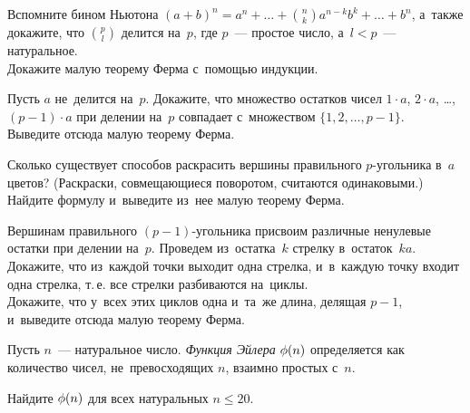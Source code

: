 \begin{problems}

\item
\subproblem
Вспомните бином Ньютона
\(
    (a + b)^{n}
=
    a^{n} + \ldots + \binom{n}{k} a^{n-k} b^{k} + \ldots + b^{n}
\),
а~также докажите, что $\binom{p}{l}$ делится на~$p$, где $p$~--- простое число,
а~$l < p$~--- натуральное.
\\
\subproblem
Докажите малую теорему Ферма с~помощью индукции.

\item%
%
\subproblem
Пусть $a$ не~делится на~$p$.
Докажите, что множество остатков чисел
$1 \cdot a$, $2\cdot a$, \ldots, $(p - 1) \cdot a$ при делении на~$p$ совпадает
с~множеством $\{ 1, 2, \ldots, p - 1 \}$.
\\
\subproblem
Выведите отсюда малую теорему Ферма.

\item
Сколько существует способов раскрасить вершины правильного $p$-угольника
в~$a$ цветов?
(Раскраски, совмещающиеся поворотом, считаются одинаковыми.)
Найдите формулу и~выведите из~нее малую теорему Ферма.

\item
{}%
Вершинам правильного $(p - 1)$-угольника присвоим различные ненулевые остатки
при делении на~$p$.
Проведем из~остатка~$k$ стрелку в~остаток~$k a$.
\\
\subproblem
Докажите, что из~каждой точки выходит одна стрелка, и~в~каждую точку входит
одна стрелка, т.\,е. все стрелки разбиваются на~циклы.
\\
\subproblem
Докажите, что у~всех этих циклов одна и~та~же длина, делящая $p - 1$,
и~выведите отсюда малую теорему Ферма.


\end{problems}

Пусть $n$~--- натуральное число.
\emph{Функция Эйлера} $\phi(n)$ определяется как количество чисел,
не~превосходящих $n$, взаимно простых с~$n$.

Найдите $\phi(n)$ для всех натуральных $n \leq 20$.

